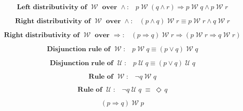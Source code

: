 \documentclass[12pt, fleqn, leqno]{article}
\newcommand{\equivs}{\ensuremath{\;\equiv\;}}       %
\newcommand{\impl}{\ensuremath{\Rightarrow}}        %
\newcommand{\Until}{\;\mathcal{U}\;}
\newcommand{\Wait}{\;\mathcal{W}\;}
\newcommand{\Event}{\Diamond\,}
\newcommand{\spacer}{\vspace{-30pt}}
\begin{document}
\begin{equation}\label{E:leftWaitAndDist}
\textbf{Left distributivity of $\Wait$ over $\land$:}\quad p \Wait (q \land r) \impl p \Wait q \land p \Wait r
\end{equation}

\spacer

\begin{equation}\label{E:rightWaitAndDist}
\textbf{Right distributivity of $\Wait$ over $\land$:}\quad (p \land q) \Wait r\equiv p \Wait r \land q \Wait r
\end{equation}

\spacer

\begin{equation}\label{E:rightWaitImplDist}
\textbf{Right distributivity of $\Wait$ over $\impl$:}\quad (p \impl q) \Wait r\impl (p \Wait r \impl q \Wait r)
\end{equation}

\spacer

\begin{equation}\label{E:disjunctWait}
\textbf{Disjunction rule of $\Wait$:}\quad p\Wait q\equiv (p\lor q)\Wait q
\end{equation}

\spacer

\begin{equation}\label{E:disjunctUntil}
\textbf{Disjunction rule of $\Until$:}\quad p\Until q\equiv (p\lor q)\Until q
\end{equation}

\spacer

\begin{equation}\label{E:ruleWait}
\textbf{Rule of $\Wait$:}\quad \neg q \Wait q
\end{equation}

\spacer

\begin{equation}\label{E:ruleUntil}
\textbf{Rule of $\Until$:}\quad \neg q \Until q\equivs \Event q
\end{equation}

\spacer

\begin{equation}\label{E:pImplQWaitP}
(p\impl q)\Wait p
\end{equation}
\end{document}
